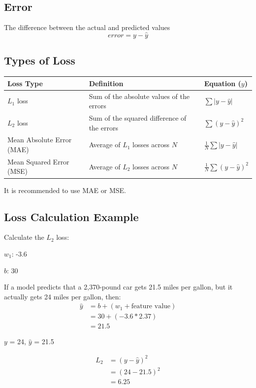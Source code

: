 \documentclass[a4paper,12pt]{article}
\begin{document}
\subsection{Error}
The difference between the actual and predicted values
\begin{equation}
error = y - \hat{y}
\end{equation}

\subsection{Types of Loss}
\begin{center}
\begin{tabularx}{\textwidth}{@{}lXl@{}}
\toprule
Loss Type & Definition & Equation ($y$) \\ 
\midrule
$L_1$ loss & Sum of the absolute values of the errors & $\sum |y - \hat{y}|$ \\
$L_2$ loss & Sum of the squared difference of the errors & $\sum (y - \hat{y})^2$ \\
Mean Absolute Error (MAE) & Average of $L_1$ losses across $N$ & $ \frac{1}{N} \sum |y - \hat{y}|$ \\
Mean Squared Error (MSE) & Average of $L_2$ losses across $N$ & $ \frac{1}{N} \sum (y - \hat{y})^2$ \\
\bottomrule
\end{tabularx}
\end{center}

\noindent It is recommended to use MAE or MSE.

\subsection{Loss Calculation Example}
Calculate the $L_2$ loss:

$w_1$: -3.6

$b$: 30

\noindent If a model predicts that a 2,370-pound car gets 21.5 miles per gallon, but it actually gets 24 miles per gallon, then:
\begin{align}
\hat{y} &= b + (w_1 + \text{feature value}) \\
       &= 30 + (-3.6 * 2.37) \\ &= 21.5
\end{align}

\noindent $y$ = 24, $\hat{y}$ = 21.5

\begin{align}
L_2 &= (y - \hat{y})^2 \\
    &= (24 - 21.5)^2 \\
    &= 6.25
\end{align}
\end{document}
